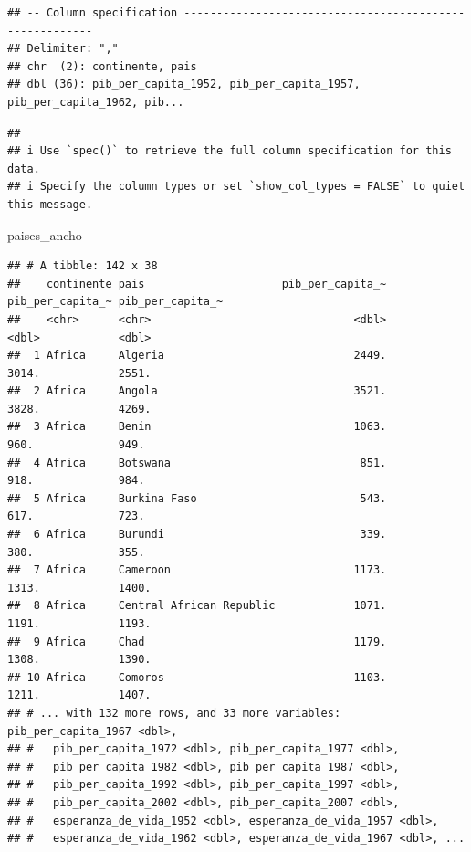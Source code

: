 \documentclass[
  openany]{book}
\newenvironment{Shaded}{\begin{snugshade}}{\end{snugshade}}
\newcommand{\NormalTok}[1]{#1}
\begin{document}
\begin{verbatim}
## -- Column specification --------------------------------------------------------
## Delimiter: ","
## chr  (2): continente, pais
## dbl (36): pib_per_capita_1952, pib_per_capita_1957, pib_per_capita_1962, pib...
\end{verbatim}

\begin{verbatim}
## 
## i Use `spec()` to retrieve the full column specification for this data.
## i Specify the column types or set `show_col_types = FALSE` to quiet this message.
\end{verbatim}

\begin{Shaded}
\begin{Highlighting}[]
\NormalTok{paises\_ancho}
\end{Highlighting}
\end{Shaded}

\begin{verbatim}
## # A tibble: 142 x 38
##    continente pais                     pib_per_capita_~ pib_per_capita_~ pib_per_capita_~
##    <chr>      <chr>                               <dbl>            <dbl>            <dbl>
##  1 Africa     Algeria                             2449.            3014.            2551.
##  2 Africa     Angola                              3521.            3828.            4269.
##  3 Africa     Benin                               1063.             960.             949.
##  4 Africa     Botswana                             851.             918.             984.
##  5 Africa     Burkina Faso                         543.             617.             723.
##  6 Africa     Burundi                              339.             380.             355.
##  7 Africa     Cameroon                            1173.            1313.            1400.
##  8 Africa     Central African Republic            1071.            1191.            1193.
##  9 Africa     Chad                                1179.            1308.            1390.
## 10 Africa     Comoros                             1103.            1211.            1407.
## # ... with 132 more rows, and 33 more variables: pib_per_capita_1967 <dbl>,
## #   pib_per_capita_1972 <dbl>, pib_per_capita_1977 <dbl>,
## #   pib_per_capita_1982 <dbl>, pib_per_capita_1987 <dbl>,
## #   pib_per_capita_1992 <dbl>, pib_per_capita_1997 <dbl>,
## #   pib_per_capita_2002 <dbl>, pib_per_capita_2007 <dbl>,
## #   esperanza_de_vida_1952 <dbl>, esperanza_de_vida_1957 <dbl>,
## #   esperanza_de_vida_1962 <dbl>, esperanza_de_vida_1967 <dbl>, ...
\end{verbatim}
\end{document}

